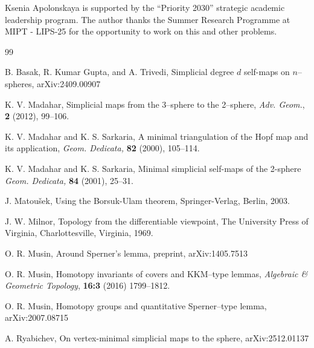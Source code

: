 \documentclass[a4paper,12pt]{article}
\begin{document}
 \bigskip 



Ksenia Apolonskaya is supported by the ``Priority 2030'' strategic academic leadership program. The author thanks the Summer Research Programme at MIPT - LIPS-25 for the opportunity to work on this and other problems.%



\medskip


\begin{thebibliography}{99}

B. Basak, R. Kumar Gupta, and A. Trivedi, Simplicial degree $d$ self-maps on $n$--spheres, 	arXiv:2409.00907

K. V. Madahar, Simplicial maps from the 3--sphere to the 2--sphere, {\em Adv. Geom.}, {\bf 2} (2012), 99--106. 

K. V. Madahar and K. S. Sarkaria, A minimal triangulation of the Hopf map and its 
application, {\it Geom. Dedicata,} {\bf 82} (2000), 105--114.

K. V. Madahar and K. S. Sarkaria, Minimal simplicial self-maps of the 2-sphere {\it Geom. Dedicata,} {\bf 84} (2001), 25--31.

J. Matou\v{s}ek, Using the Borsuk-Ulam theorem, Springer-Verlag, Berlin, 2003.

J. W. Milnor, Topology from the differentiable viewpoint, The University Press of Virginia, Charlottesville, Virginia, 1969.

{O. R. Musin,} Around Sperner's lemma, preprint, arXiv:1405.7513 

{O. R. Musin,} Homotopy invariants of covers and KKM--type lemmas,   {\it  Algebraic \& Geometric Topology}, {\bf 16:3} (2016) 1799--1812.

{O. R. Musin,} Homotopy groups and quantitative Sperner–type lemma, arXiv:2007.08715

A. Ryabichev, On vertex-minimal simplicial maps to the sphere, arXiv:2512.01137 

\end{thebibliography}

 \bigskip 
 
\end{document}
